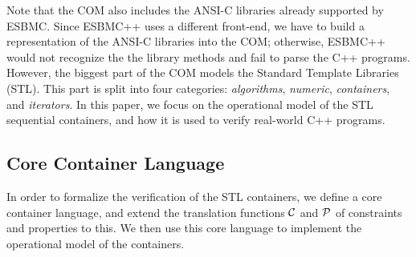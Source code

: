 \documentclass[a4paper]{llncs}
\begin{document}
Note that the COM also includes the ANSI-C libraries already
supported by ESBMC.  Since ESBMC++ uses a different front-end, we have to build
a representation of the ANSI-C libraries into the COM; otherwise, ESBMC++ would
not recognize the the library methods and fail to parse the C++ programs.
%
However, the 
biggest part of the COM models 
the Standard Template Libraries (STL).
This part is split into
four categories: \textit{algorithms}, \textit{numeric},
\textit{containers}, and \textit{iterators}.
In this paper, we focus on the operational model of the
STL sequential containers, 
and how it is used to
verify real-world C++ programs.

\subsection{Core Container Language}

In order to formalize the verification of the STL containers,
we define a core container language, and extend the translation
functions $\cal C$ and  $\cal P$ of constraints and properties to this.
We then use this core language to implement the operational model 
of the containers.
\end{document}
